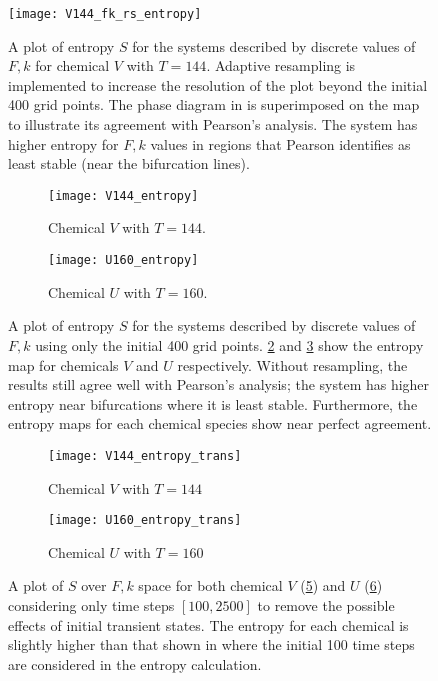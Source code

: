 \begin{figure}
	\centering
	\texttt{[image: V144\_fk\_rs\_entropy]}
	\caption{A plot of entropy $S$ for the systems described by discrete values of $F, k$ for chemical $V$ with $T = 144$. Adaptive resampling is implemented to increase the resolution of the plot beyond the initial 400 grid points. The phase diagram in  is superimposed on the map to illustrate its agreement with Pearson's analysis. The system has higher entropy for $F,k$ values in regions that Pearson identifies as least stable (near the bifurcation lines).} \label{fig:V144_fk_rs_entropy}
\end{figure}

\begin{figure}[hp!]
	\centering
	\begin{subfigure}[b]{0.48\textwidth}
		\texttt{[image: V144\_entropy]}
		\caption{Chemical $V$ with $T = 144$.} \label{fig:V144_entropy}
	\end{subfigure} \quad
	\begin{subfigure}[b]{0.48\textwidth}
		\texttt{[image: U160\_entropy]}
		\caption{Chemical $U$ with $T = 160$.} 
		\label{fig:U160_entropy}
	\end{subfigure}
	\caption{A plot of entropy $S$ for the systems described by discrete values of $F, k$ using only the initial 400 grid points. \ref{fig:V144_entropy} and \ref{fig:U160_entropy} show the entropy map for chemicals $V$ and $U$ respectively. Without resampling, the results still agree well with Pearson's analysis; the system has higher entropy near bifurcations where it is least stable. Furthermore, the entropy maps for each chemical species show near perfect agreement.} \label{fig:UV_entropy}
\end{figure}
%
\begin{figure}[p!]
	\centering
	\begin{subfigure}[b]{0.48\textwidth}
		\texttt{[image: V144\_entropy\_trans]}
		\caption{Chemical $V$ with $T = 144$} \label{fig:V144_entropy_trans}
	\end{subfigure} \quad
	\begin{subfigure}[b]{0.48\textwidth}
		\texttt{[image: U160\_entropy\_trans]}
		\caption{Chemical $U$ with $T = 160$} \label{fig:U160_entropy_trans}
	\end{subfigure}
	\caption{A plot of $S$ over $F, k$ space for both chemical $V$ (\ref{fig:V144_entropy_trans}) and $U$ (\ref{fig:U160_entropy_trans}) considering only time steps $[100, 2500]$ to remove the possible effects of initial transient states. The entropy for each chemical is slightly higher than that shown in  where the initial 100 time steps are considered in the entropy calculation.} \label{fig:UV_entropy_trans}
\end{figure}

